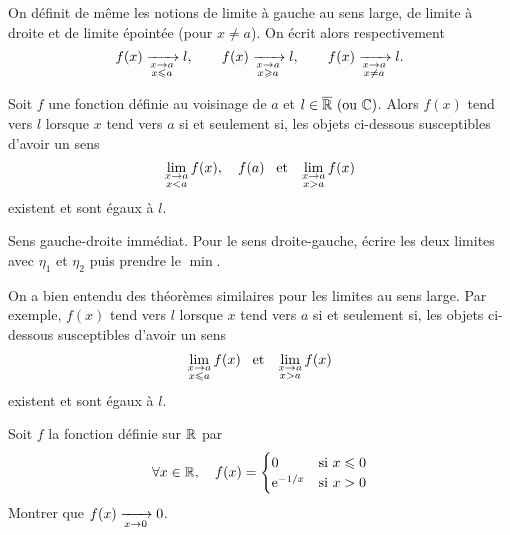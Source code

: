 \documentclass{magnolia}
\begin{document}
\begin{remarqueUnique}
\remarque On définit de même les notions de limite à gauche au sens large, de limite à
  droite et de limite épointée (pour $x\neq a$). On écrit alors respectivement
  \[f(x)\xrightarrow[ \substack{x\rightarrow a \\ x\leqslant a}]{} l, \qquad
    f(x)\xrightarrow[ \substack{x\rightarrow a \\ x\geqslant a}]{} l, \qquad
    f(x)\xrightarrow[ \substack{x\rightarrow a \\ x\not=a}]{} l.\]
\end{remarqueUnique}


\begin{proposition}[utile=-3]
Soit $f$ une fonction définie au voisinage de $a$ et $l\in\text{$\overline{\mathbb{R}}$ (ou $\mathbb{C}$)}$. Alors
$f(x)$ tend vers $l$ lorsque $x$ tend vers $a$ si et seulement si, les objets
ci-dessous susceptibles d'avoir un sens
\[\lim_{\substack{x\to a\\x<a}} f(x), \quad f(a) \quad\!\text{et}\quad\!
  \lim_{\substack{x\to a\\x>a}} f(x)\]
existent et sont égaux à $l$.
\end{proposition}

\begin{preuve}
Sens gauche-droite immédiat.
Pour le sens droite-gauche, écrire les deux limites avec $\eta_1$ et $\eta_2$ puis prendre le $\min$.
\end{preuve}

\begin{remarqueUnique}
\remarque On a bien entendu des théorèmes similaires pour les limites au sens large. Par
  exemple, $f(x)$ tend vers $l$ lorsque $x$ tend vers $a$ si et seulement si, les  objets
  ci-dessous susceptibles d'avoir un sens
  \[\lim_{\substack{x\to a\\x\leqslant a}} f(x) \quad\!\text{et}\quad\!
    \lim_{\substack{x\to a\\x>a}} f(x)\]
  existent et sont égaux à $l$.
\end{remarqueUnique}

\begin{exoUnique}
\exo Soit $f$ la fonction définie sur $\mathbb{R}$ par
  \[\forall x\in\mathbb{R} ,\quad f(x)=
    \begin{cases}
    0 & \text{si $x\leqslant 0$}\\
    {\rm e}^{-1/x} & \text{si $x>0$}
    \end{cases}\]
  Montrer que $f(x)\xrightarrow[x\rightarrow 0]{} 0$.
\end{exoUnique}
\end{document}

